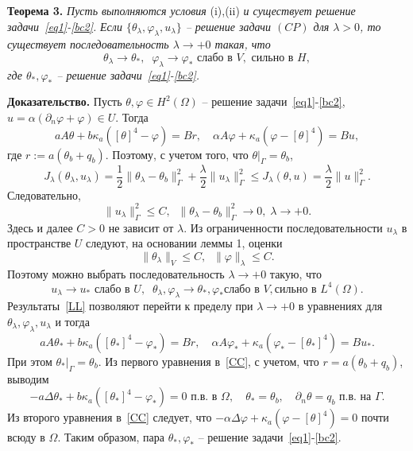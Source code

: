\textbf{Теорема 3.}
{\it
Пусть выполняются условия} (i),(ii) {\it и существует решение задачи~\eqref{eq1}-\eqref{bc2}.}
    {\it  Если $\{\theta_\lambda,\varphi_\lambda,u_\lambda\}$ -- решение
задачи $(CP)$ для $\lambda>0$, то существует последовательность
$\lambda\to +0$
такая, что}
\[
    \theta_\lambda\rightarrow\theta_*, \;\; \varphi_\lambda\rightarrow\varphi_*
    \text{ слабо в }V,\text{ сильно в }H,
\]
    {\it где $\theta_*,\varphi_*$ -- решение задачи~\eqref{eq1}-\eqref{bc2}.}

    {\bf Доказательство.}
Пусть $\theta,\varphi\in H^2(\Omega)$ -- решение задачи~\eqref{eq1}-\eqref{bc2},
$u=\alpha(\partial_n\varphi+\varphi)\in U.$ Тогда
\[
    a A \theta + b \kappa_a ([\theta]^4 - \varphi ) = Br,\quad
    \alpha A \varphi + \kappa_a (\varphi - [\theta]^4)  = Bu,
\]
где $r:=a(\theta_b+q_b).$ Поэтому, с учетом того, что $\theta|_\Gamma=\theta_b$,
\[
    J_\lambda(\theta_\lambda, u_\lambda) = \frac{1}{2}\|\theta_\lambda -\theta_b\|^2_\Gamma
    + \frac{\lambda}{2}\|u_\lambda\|^2_\Gamma\leq J_\lambda(\theta, u)=\frac{\lambda}{2}\|u\|^2_\Gamma.
\]
Следовательно,
\[
    \|u_\lambda\|^2_\Gamma\leq C,\;\; \|\theta_\lambda -\theta_b\|^2_\Gamma\to 0,\; \lambda\to +0.
\]
Здесь и далее $C>0$ не зависит от $\lambda.$
Из ограниченности последовательности $u_\lambda$ в пространстве $U$ следуют, на основании
леммы 1, оценки
\[
    \|\theta_\lambda\|_V \leq C,\;\;
    \|\varphi\|_\lambda \leq C.
\]
Поэтому можно выбрать последовательность $\lambda\to+0$ такую, что
\begin{equation}
    \label{LL}
    u_\lambda \rightarrow u_* \text{  слабо в } U, \;\;
    \theta_\lambda, \varphi_\lambda \rightarrow \theta_*,\varphi_* \text{
        слабо в } V, \text{
        сильно в } L^4(\Omega).
\end{equation}
Результаты~\eqref{LL} позволяют перейти к пределу при $\lambda\to+0$
в уравнениях для $\theta_\lambda,\varphi_\lambda,u_\lambda$ и тогда
\begin{equation}
    \label{CC}
    a A \theta_* + b \kappa_a ([\theta_*]^4 - \varphi_* ) = Br,\quad
    \alpha A \varphi_* + \kappa_a (\varphi_* - [\theta_*]^4)  = Bu_*.
\end{equation}
При этом $\theta_*|_\Gamma=\theta_b.$
Из первого уравнения в~\eqref{CC}, с учетом, что $r=a(\theta_b+q_b)$,
выводим
\[
    - a\Delta\theta_* + b\kappa_a([\theta_*]^4- \varphi_*)=0 \text{ п.в. в }\Omega,
    \quad \theta_*=\theta_b,\quad \partial_n\theta = q_b \text{ п.в. на  }\Gamma.
\]
Из второго уравнения в~\eqref{CC} следует, что $-\alpha \Delta \varphi +
\kappa_a(\varphi-[\theta]^4)=0$ почти всюду в $\Omega.$ Таким образом,
пара $\theta_*,\varphi_*$ -- решение задачи~\eqref{eq1}-\eqref{bc2}.

